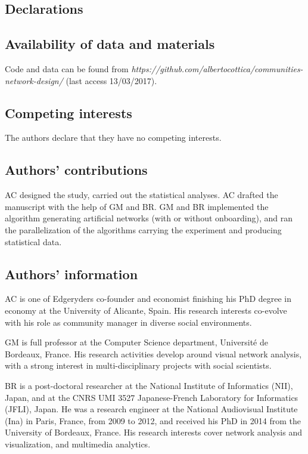 \documentclass{bmcart}
\begin{document}
\begin{backmatter}

\section*{Declarations}

\subsection*{Availability of data and materials}
Code and data can be found from \emph{https://github.com/albertocottica/communities-network-design/} (last access 13/03/2017).

\subsection*{Competing interests}
  The authors declare that they have no competing interests.

\subsection*{Authors' contributions}
AC designed the study, carried out the statistical analyses. AC drafted the manuscript with the help of GM and BR. GM and BR implemented the algorithm generating artificial networks (with or without onboarding), and ran the parallelization of the algorithms carrying the experiment and producing statistical data.

\subsection*{Authors' information}
AC is one of Edgeryders co-founder and economist finishing his PhD degree in economy at the University of Alicante, Spain. His research interests co-evolve with his role as community manager in diverse social environments.

GM is full professor at the Computer Science department, Universit\'e de Bordeaux, France. His research activities develop around visual network analysis, with a strong interest in multi-disciplinary projects with social scientists.

BR is a post-doctoral researcher at the National Institute of Informatics (NII), Japan, and at the CNRS UMI 3527 Japanese-French Laboratory for Informatics (JFLI), Japan. He was a research engineer at the National Audiovisual Institute (Ina) in Paris, France, from 2009 to 2012, and received his PhD in 2014 from the University of Bordeaux, France. His research interests cover network analysis and visualization, and multimedia analytics.


\end{backmatter}
\end{document}
